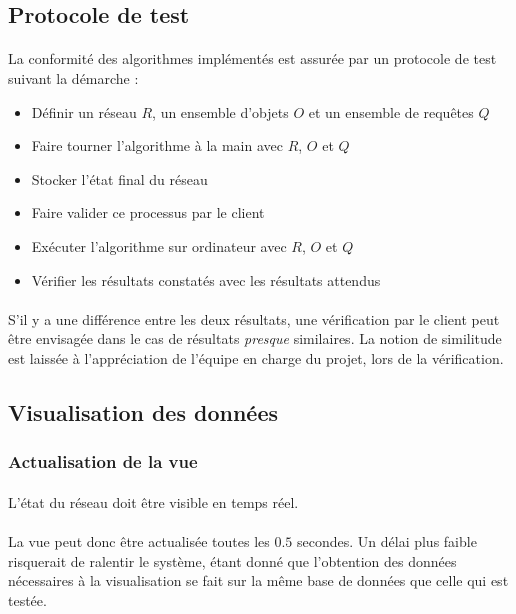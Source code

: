 \documentclass[12pt]{article}
\begin{document}
\subsection{Protocole de test}

\paragraph{} La conformité des algorithmes implémentés est assurée par un protocole de test suivant la démarche :

\begin{itemize}
	\item Définir un réseau $R$, un ensemble d'objets $O$ et un ensemble de requêtes $Q$
	\item Faire tourner l'algorithme à la main avec $R$, $O$ et $Q$
	\item Stocker l'état final du réseau
	\item Faire valider ce processus par le client
	\item Exécuter l'algorithme sur ordinateur avec $R$, $O$ et $Q$
	\item Vérifier les résultats constatés avec les résultats attendus
\end{itemize}
	
\paragraph{} S'il y a une différence entre les deux résultats, une vérification par le client peut être envisagée dans le cas de résultats \textit{presque} similaires. 
La notion de similitude est laissée à l'appréciation de l'équipe en charge du projet, lors de la vérification.


\subsection{Visualisation des données}

\subsubsection{Actualisation de la vue}

\paragraph{} L'état du réseau doit être visible en temps réel.

\paragraph{} La vue peut donc être actualisée toutes les $0.5$ secondes. 
Un délai plus faible risquerait de ralentir le système, étant donné que l'obtention des données nécessaires à la visualisation se fait sur la même base de données que celle qui est testée.
\end{document}
